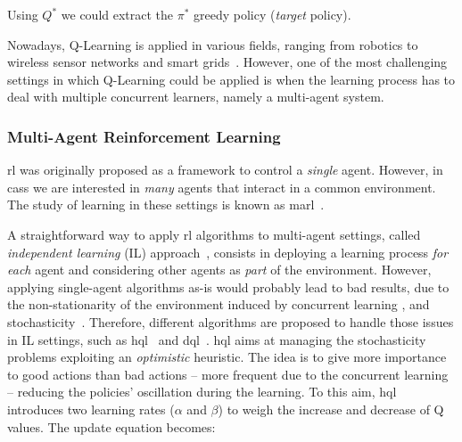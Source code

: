 %
Using $Q^*$ we could extract the $\pi^*$ greedy policy (\emph{target} policy).

Nowadays, Q-Learning is applied in various fields, ranging from robotics to wireless sensor networks and smart grids~\cite{DBLP:journals/access/JangKHK19}.
%
However, one of the most challenging settings in which Q-Learning could be applied is when the learning process has to deal with multiple concurrent learners, namely a multi-agent system.

\subsubsection{Multi-Agent Reinforcement Learning}

\ac{rl} was originally proposed as a framework to control a \emph{single} agent. %
%
However, in \acp{cas} we are interested in \emph{many} agents that interact in a common environment.
%
The study of learning in these settings is known as \ac{marl}~\cite{DBLP:conf/icml/Tan93}.

A straightforward way to apply \ac{rl} algorithms to multi-agent settings, called \emph{independent learning} (IL) approach~\cite{DBLP:conf/icml/Tan93}, consists in deploying a learning process \emph{for each} agent and considering other agents as \emph{part} of the environment.
%
However, applying single-agent algorithms as-is would probably lead to bad results, due to the non-stationarity of the environment induced by concurrent learning%
, and stochasticity~\cite{DBLP:journals/ker/MatignonLF12}. 
%
Therefore, different algorithms are proposed to handle those issues in IL settings, such as \acl{hql}~\cite{DBLP:conf/iros/MatignonLF07} and \ac{dql}~\cite{DBLP:conf/icml/LauerR00}. %
%
\Ac{hql} aims at managing the stochasticity problems exploiting an \emph{optimistic} heuristic. 
%
The idea is to give more importance to good actions than bad actions -- more frequent due to the concurrent learning -- reducing the policies' oscillation during the learning.
%
To this aim, \ac{hql} introduces two learning rates ($\alpha$ and $\beta$) to weigh the increase and decrease of Q values. The update equation becomes:

